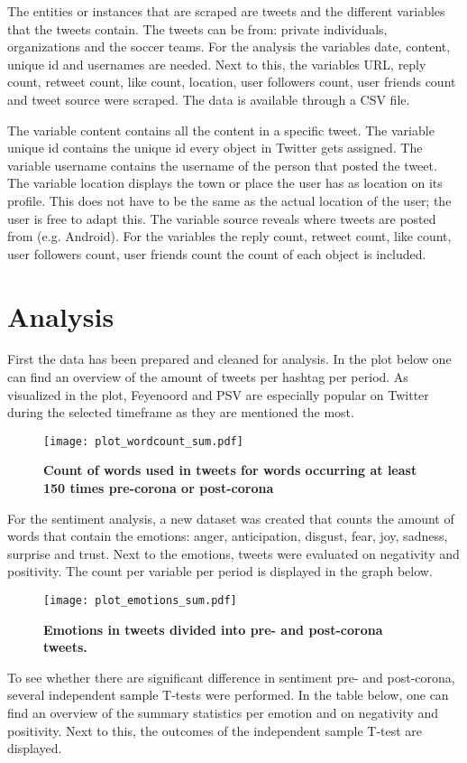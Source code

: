 \documentclass[12pt]{article}
\begin{document}
The entities or instances that are scraped are tweets and the different variables that the tweets contain. The tweets can be from: private individuals, organizations and the soccer teams. For the analysis the variables date, content, unique id and usernames are needed. Next to this, the variables URL, reply count, retweet count, like count, location, user followers count, user friends count and tweet source were scraped. The data is available through a CSV file.

The variable content contains all the content in a specific tweet. The variable unique id contains the unique id every object in Twitter gets assigned. The variable username contains the username of the person that posted the tweet. The variable location displays the town or place the user has as location on its profile. This does not have to be the same as the actual location of the user; the user is free to adapt this. The variable source reveals where tweets are posted from (e.g. Android). For the variables the reply count, retweet count, like count, user followers count, user friends count the count of each object is included.

\section{Analysis}
First the data has been prepared and cleaned for analysis. In the plot below one can find an overview of the amount of tweets per hashtag per period. As visualized in the plot, Feyenoord and PSV are especially popular on Twitter during the selected timeframe as they are mentioned the most.

\begin{figure}[H]
\caption{\textbf{Count of words used in tweets for words occurring at least 150 times pre-corona or post-corona}}
\texttt{[image: plot\_wordcount\_sum.pdf]}

\end{figure}
For the sentiment analysis, a new dataset was created that counts the amount of words that contain the emotions: anger, anticipation, disgust, fear, joy, sadness, surprise and trust. Next to the emotions, tweets were evaluated on negativity and positivity. The count per variable per period is displayed in the graph below.

\begin{figure}[H]
\caption{\textbf{Emotions in tweets divided into pre- and post-corona tweets.}}
\texttt{[image: plot\_emotions\_sum.pdf]}

\end{figure}
To see whether there are significant difference in sentiment pre- and post-corona, several independent sample T-tests were performed. In the table below, one can find an overview of the summary statistics per emotion and on negativity and positivity. Next to this, the outcomes of the independent sample T-test are displayed.
\end{document}

